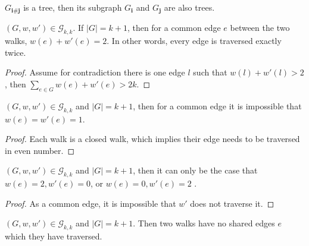 \begin{lemma}
  \label{lem:subgraph_of_tree}
  \notready
  $G_{\mathbf{i} \# \mathbf{j}}$ is a tree, then its subgraph $G_{\mathbf{i}}$ and $G_{\mathbf{j}}$ are also trees.
\end{lemma}


\begin{lemma}
  \label{lem:traverse_exactly_twice}
  \notready
  $(G, w, w') \in \mathcal{G}_{k, k}$. If $|G| = k + 1$, then for a common edge $e$ between the two walks, $w(e) + w'(e) =2$. In other words, every edge is traversed exactly twice.
\end{lemma}

\begin{proof}
  Assume for contradiction there is one edge $l$ such that $w(l) + w'(l) > 2$, then $\sum_{e \in G} w(e) + w'(e) > 2k$.
\end{proof}


\begin{lemma}
  \label{lem:i_j_traverse_once}
  \notready
    $(G, w, w') \in \mathcal{G}_{k, k}$ and $|G| = k + 1$, then for a common edge it is impossible that $w(e) = w'(e) = 1$.
\end{lemma}

\begin{proof}
  Each walk is a closed walk, which implies their edge needs to be traversed in even number.
\end{proof}


\begin{lemma}
  \label{lem:one_walk_traverse_twice}
  \notready
    $(G, w, w') \in \mathcal{G}_{k, k}$ and $|G| = k + 1$, then it can only be the case that $w(e) = 2, w'(e) = 0$, or $w(e) = 0, w'(e) = 2$ .
\end{lemma}

\begin{proof}
As a common edge, it is impossible that $w'$ does not traverse it.
\end{proof}


\begin{lemma}
  \label{lem:no_shared_edges}
  $(G, w, w') \in \mathcal{G}_{k, k}$ and $|G| = k + 1$. Then two walks have no shared edges $e$ which they have traversed.
\end{lemma}


